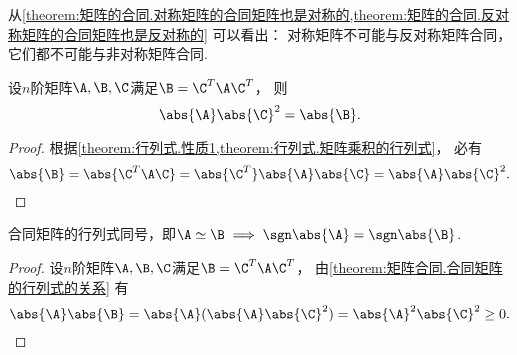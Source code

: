 \begin{remark}
从\cref{theorem:矩阵的合同.对称矩阵的合同矩阵也是对称的,theorem:矩阵的合同.反对称矩阵的合同矩阵也是反对称的}
可以看出：
对称矩阵不可能与反对称矩阵合同，
它们都不可能与非对称矩阵合同.
\end{remark}

\begin{proposition}\label{theorem:矩阵合同.合同矩阵的行列式的关系}
设\(n\)阶矩阵\(\A,\B,\C\)满足\(\B=\C^T\A\C^T\)，
则\[
	\abs{\A}\abs{\C}^2
	=\abs{\B}.
\]
\begin{proof}
根据\cref{theorem:行列式.性质1,theorem:行列式.矩阵乘积的行列式}，
必有\[
	\abs{\B}
	=\abs{\C^T\A\C}
	=\abs{\C^T}\abs{\A}\abs{\C}
	=\abs{\A}\abs{\C}^2.
	\qedhere
\]
\end{proof}
\end{proposition}

\begin{proposition}
合同矩阵的行列式同号，即\(\A\simeq\B\implies\sgn\abs{\A}=\sgn\abs{\B}\).
\begin{proof}
设\(n\)阶矩阵\(\A,\B,\C\)满足\(\B=\C^T\A\C^T\)，
由\cref{theorem:矩阵合同.合同矩阵的行列式的关系} 有\[
	\abs{\A}\abs{\B}
	=\abs{\A}(\abs{\A}\abs{\C}^2)
	=\abs{\A}^2\abs{\C}^2 \geq 0.
	\qedhere
\]
\end{proof}
\end{proposition}

